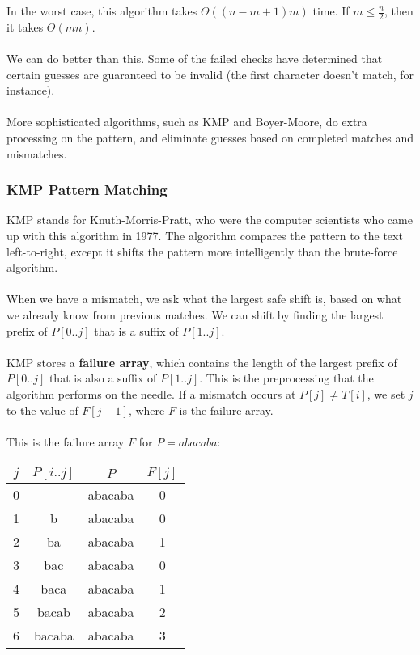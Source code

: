 \documentclass[]{article}
\theoremstyle{definition}
\begin{document}
				In the worst case, this algorithm takes $\Theta((n - m + 1)m)$ time. If $m \le \frac{n}{2}$, then it takes $\Theta(mn)$.
				\\ \\
				We can do better than this. Some of the failed checks have determined that certain guesses are guaranteed to be invalid (the first character doesn't match, for instance).
				\\ \\
				More sophisticated algorithms, such as KMP and Boyer-Moore, do extra processing on the pattern, and eliminate guesses based on completed matches and mismatches.
			\subsubsection{KMP Pattern Matching}
				KMP stands for Knuth-Morris-Pratt, who were the computer scientists who came up with this algorithm in 1977. The algorithm compares the pattern to the text left-to-right, except it shifts the pattern more intelligently than the brute-force algorithm.
				\\ \\
				When we have a mismatch, we ask what the largest safe shift is, based on what we already know from previous matches. We can shift by finding the largest prefix of $P[0..j]$ that is a suffix of $P[1..j]$.
				\\ \\
				KMP stores a \textbf{failure array}, which contains the length of the largest prefix of $P[0..j]$ that is also a suffix of $P[1..j]$. This is the preprocessing that the algorithm performs on the needle. If a mismatch occurs at $P[j] \ne T[i]$, we set $j$ to the value of $F[j - 1]$, where $F$ is the failure array.
				\\ \\
				This is the failure array $F$ for $P = abacaba$:
				\begin{center}
					\begin{tabular}{|c|c|c|c|}
						\hline
						$j$ & $P[i..j]$ & $P$ & $F[j]$ \\ \hline
						0 & & abacaba & 0 \\
						1 & b & abacaba & 0 \\
						2 & ba & abacaba & 1 \\
						3 & bac & abacaba & 0 \\
						4 & baca & abacaba & 1 \\
						5 & bacab & abacaba & 2 \\
						6 & bacaba & abacaba & 3 \\ \hline
					\end{tabular}
				\end{center}
				
\end{document}
